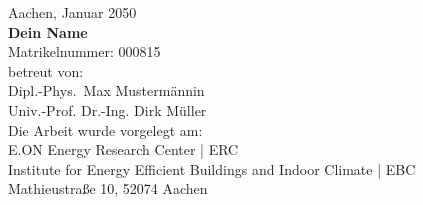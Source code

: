 \begin{titlepage}
\vfill
\begin{center}
\begingroup
{}\selectfont
Aachen, Januar 2050\\
\addvspace{0.5cm}
\textbf{Dein Name} \\
Matrikelnummer: 000815 \\
\addvspace{0.5cm}
betreut von:\\
Dipl.-Phys.~Max Mustermännin \\
Univ.-Prof. Dr.-Ing. Dirk Müller \\
\addvspace{0.5cm}
Die Arbeit wurde vorgelegt am:\\
E.ON Energy Research Center | ERC \\
Institute for Energy Efficient Buildings and Indoor Climate | EBC\\
Mathieustraße 10, 52074 Aachen\\
\endgroup
\end{center}

\end{titlepage}
